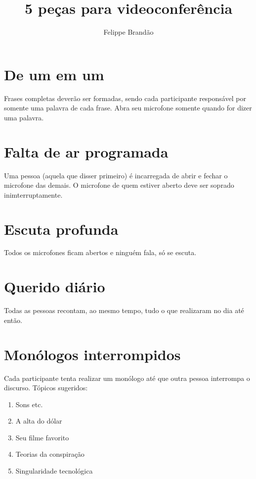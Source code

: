 \documentclass[11pt, a4paper]{article}
\title{%
	\vspace{-5cm}
	5 peças para videoconferência
	}
\author{Felippe Brandão}
\date{}
\begin{document}
\maketitle
\section{De um em um}
Frases completas deverão ser formadas, sendo cada participante responsável por somente uma palavra de cada frase. Abra seu microfone somente quando for dizer uma palavra.

\section{Falta de ar programada}
Uma pessoa (aquela que disser primeiro) é incarregada de abrir e fechar o microfone das demais. O microfone de quem estiver aberto deve ser soprado inimterruptamente.

\section{Escuta profunda}
Todos os microfones ficam abertos e ninguém fala, só se escuta.

\section{Querido diário}
Todas as pessoas recontam, ao mesmo tempo, tudo o que realizaram no dia até então.

\section{Monólogos interrompidos}
Cada participante tenta realizar um monólogo até que outra pessoa interrompa o discurso.
Tópicos sugeridos:
\begin{enumerate}
	\item Sons etc. 
	\item A alta do dólar
	\item Seu filme favorito
	\item Teorias da conspiração
	\item Singularidade tecnológica 
\end{enumerate}
\end{document}
